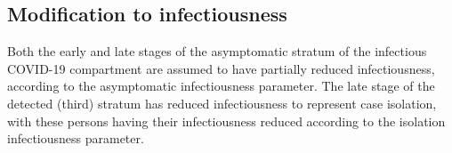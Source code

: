\subsection{Modification to infectiousness}
Both the early and late stages of the asymptomatic stratum 
of the infectious COVID-19 compartment are assumed to have 
partially reduced infectiousness,
according to the asymptomatic infectiousness parameter.
The late stage of the detected (third) stratum has reduced infectiousness 
to represent case isolation,
with these persons having their infectiousness reduced 
according to the isolation infectiousness parameter.
